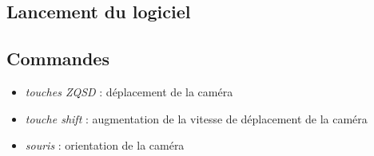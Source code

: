 

\subsection{Lancement du logiciel}



\subsection{Commandes}

\begin{itemize}
	\item \textit{touches ZQSD} : déplacement de la caméra
	\item \textit{touche shift} : augmentation de la vitesse de déplacement de la caméra
	\item \textit{souris} : orientation de la caméra
\end{itemize}
